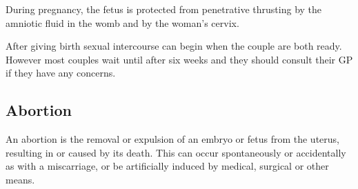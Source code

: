 \documentclass[12pt,a4paper,onecolumn]{article}
\begin{document}
During pregnancy, the fetus is protected from penetrative thrusting by the amniotic fluid in the
womb and by the woman's cervix.

After giving birth sexual intercourse can begin when the couple are both ready. However most couples
wait until after six weeks and they should consult their GP if they have any concerns.

\subsection{Abortion}

An abortion is the removal or expulsion of an embryo or fetus from the uterus, resulting in or
caused by its death. This can occur spontaneously or accidentally as with a miscarriage, or be
artificially induced by medical, surgical or other means.
\end{document}
